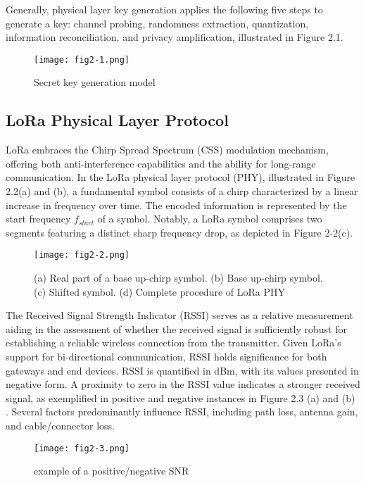 Generally, physical layer key generation applies the following five steps to generate a key: channel probing, randomness extraction, quantization, information reconciliation, and privacy amplification, illustrated in Figure 2.1.
\begin{figure}
  \centering
  \texttt{[image: fig2-1.png]}
  \caption{Secret key generation model\cite{7120014}}
  \label{fig:2-1}
\end{figure}

\subsection{LoRa Physical Layer Protocol}
LoRa embraces the Chirp Spread Spectrum (CSS) modulation mechanism, offering both anti-interference capabilities and the ability for long-range communication. In the LoRa physical layer protocol (PHY), illustrated in Figure 2.2(a) and (b), a fundamental symbol consists of a chirp characterized by a linear increase in frequency over time. The encoded information is represented by the start frequency \(f_{start}\) of a symbol. Notably, a LoRa symbol comprises two segments featuring a distinct sharp frequency drop, as depicted in Figure 2-2(c).
\begin{figure}
  \centering
  \texttt{[image: fig2-2.png]}
  \caption{(a) Real part of a base up-chirp symbol. (b) Base up-chirp symbol. (c) Shifted symbol. (d) Complete procedure of LoRa PHY\cite{10.1145/3546869}}
  \label{fig:2-2}
\end{figure}

The Received Signal Strength Indicator (RSSI) serves as a relative measurement aiding in the assessment of whether the received signal is sufficiently robust for establishing a reliable wireless connection from the transmitter. Given LoRa's support for bi-directional communication, RSSI holds significance for both gateways and end devices. RSSI is quantified in dBm, with its values presented in negative form. A proximity to zero in the RSSI value indicates a stronger received signal, as exemplified in positive and negative instances in Figure 2.3 (a) and (b) \cite{rssiandsnrfigure}. Several factors predominantly influence RSSI, including path loss, antenna gain, and cable/connector loss.
\begin{figure}
  \centering
  \texttt{[image: fig2-3.png]}
  \caption{example of a positive/negative SNR}
  \label{fig:2-3}
\end{figure}

